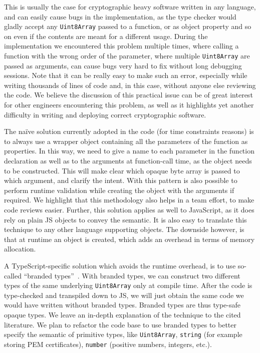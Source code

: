 This is usually the case for cryptographic heavy software written in any language, 
and can easily cause bugs in the implementation, as the type checker
would gladly accept any \texttt{Uint8Array} passed to a function, or as object 
property and so on even if the contents are meant for a different usage. 
During the implementation we encountered this problem multiple times,
where calling a function with the wrong order of the parameter, where
multiple \texttt{Uint8Array} are passed as arguments, can cause bugs
very hard to fix without long debugging sessions. Note that it can be
really easy to make such an error, especially while writing thousands
of lines of code and, in this case, without anyone else reviewing the code.
We believe the discussion of this practical issue can be of great interest for other
engineers encountering this problem, as well as it highlights yet another
difficulty in writing and deploying correct cryptographic software.

The na\"ive solution currently adopted in the code (for time constraints reasons)
is to always use a wrapper object containing all the parameters of the function
as properties. In this way, we need to give a name to each parameter
in the function declaration as well as to the arguments at function-call
time, as the object needs to be constructed. This will make clear which
opaque byte array is passed to which argument, and clarify the intent.
With this pattern is also possible to perform runtime validation
while creating the object with the arguments if required.
We highlight that this methodology also helps in a team effort, to make
code reviews easier. Further, this solution applies as well to JavaScript,
as it does rely on plain JS objects to convey the semantic. It is also
easy to translate this technique to any other language supporting objects.
The downside however, is that at runtime an object is created, which adds 
an overhead in terms of memory allocation.

A TypeScript-specific solution which avoids the runtime overhead, is to use
so-called ``branded types''~\cite{vanderkam2019effective, goldberg2022learning}. 
With branded types, we can construct two 
different types of the same underlying \texttt{Uint8Array} only
at compile time. After the code is type-checked and transpiled down to JS,
we will just obtain the same code we would have written without branded types.
Branded types are thus type-safe opaque types. We leave an in-depth explanation
of the technique to the cited literature. We plan to refactor the code base
to use branded types to better specify the semantic of primitive types,
like \texttt{Uint8Array}, \texttt{string} (for example storing PEM certificates),
\texttt{number} (positive numbers, integers, etc.).

